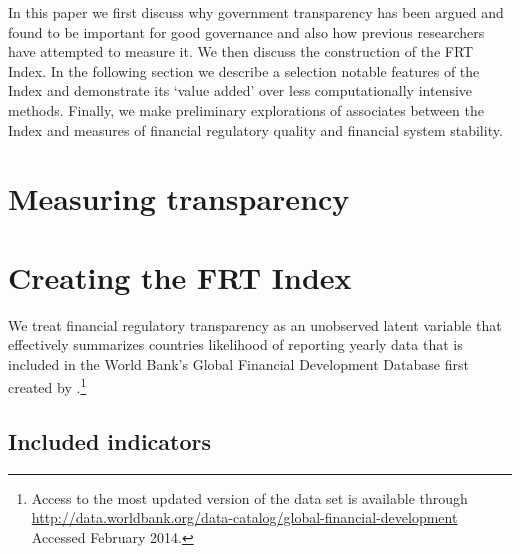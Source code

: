 \documentclass[a4paper]{article}
\begin{document}
In this paper we first discuss why government transparency has been argued and found to be important for good governance and also how previous researchers have attempted to measure it. We then discuss the construction of the FRT Index. In the following section we describe a selection notable features of the Index and demonstrate its `value added' over less computationally intensive methods. Finally, we make preliminary explorations of associates between the Index and measures of financial regulatory quality and financial system stability.  


\section{Measuring transparency}


\section{Creating the FRT Index}

We treat financial regulatory transparency as an unobserved latent variable that effectively summarizes countries likelihood of reporting yearly data that is included in the World Bank's Global Financial Development Database first created by \cite{Cihak2012}.\footnote{Access to the most updated version of the data set is available through \url{http://data.worldbank.org/data-catalog/global-financial-development} Accessed February 2014.}

\subsection{Included indicators}
\end{document}
